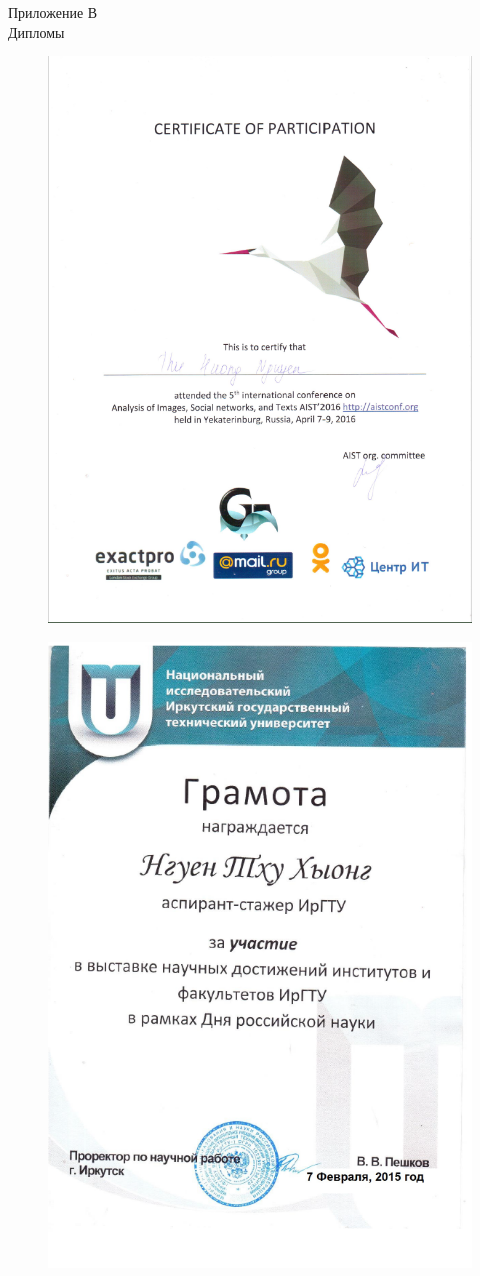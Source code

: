 \newpage
\begin{center}
Приложение В\\
Дипломы
\end{center}
\begin{figure}[ht!]
\centering
\includegraphics [width=0.8\linewidth] {images/p29.png}\label{imgp29}
\end{figure}
\begin{figure}[ht!]
\centering
\includegraphics [width=0.8\linewidth] {images/p27.png}\label{imgp27}
\end{figure}
